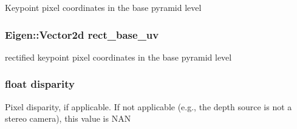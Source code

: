 \label{classfovis_1_1KeypointData_ac37015bdf7c90c14e5563d6772bac549}
Keypoint pixel coordinates in the base pyramid level \hypertarget{classfovis_1_1KeypointData_a49f1a8f0899d5dafe1917d0298d6ccc0}{
\subsubsection[{rect\_\-base\_\-uv}]{\setlength{\rightskip}{0pt plus 5cm}Eigen::Vector2d {\bf rect\_\-base\_\-uv}}}
\label{classfovis_1_1KeypointData_a49f1a8f0899d5dafe1917d0298d6ccc0}
rectified keypoint pixel coordinates in the base pyramid level \hypertarget{classfovis_1_1KeypointData_a312732f219960346581401b33cf44d5f}{
\subsubsection[{disparity}]{\setlength{\rightskip}{0pt plus 5cm}float {\bf disparity}}}
\label{classfovis_1_1KeypointData_a312732f219960346581401b33cf44d5f}
Pixel disparity, if applicable. If not applicable (e.g., the depth source is not a stereo camera), this value is NAN

